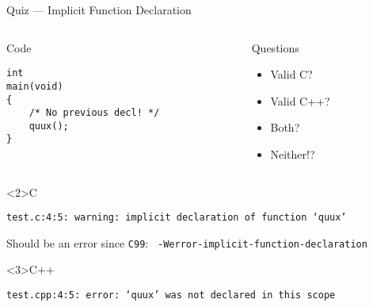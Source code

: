 \documentclass[presentation,aspectratio=169]{beamer}
\begin{document}
\begin{frame}[fragile,label={sec:org23c4234}]{Quiz — Implicit Function Declaration}
 \begin{columns}
\begin{column}{0.48\columnwidth}
\begin{block}{Code}
\begin{verbatim}
int
main(void)
{
    /* No previous decl! */
    quux();
}
\end{verbatim}
\end{block}
\end{column}

\begin{column}{0.48\columnwidth}
\begin{block}{Questions}
\begin{itemize}
\item Valid C?
\item Valid C++?
\item Both?
\item Neither!?
\end{itemize}
\end{block}
\end{column}
\end{columns}

\begin{block}<2>{C}
\begin{verbatim}
test.c:4:5: warning: implicit declaration of function ‘quux’
\end{verbatim}
Should be an error since \texttt{C99}: \texttt{ -Werror-implicit-function-declaration}
\end{block}

\vspace{-2cm}
\begin{block}<3>{C++}
\begin{verbatim}
test.cpp:4:5: error: ‘quux’ was not declared in this scope
\end{verbatim}
\end{block}
\end{frame}

\end{document}
